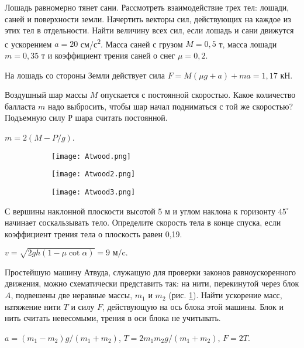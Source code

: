 \begin{ex} %
Лошадь равномерно тянет сани. Рассмотреть взаимодействие трех тел: лошади, саней и поверхности земли. Начертить векторы сил, действующих на каждое из этих тел в отдельности. Найти величину всех сил, если лошадь и сани движутся с ускорением $a = 20$ см/с\textsuperscript{2}. Масса саней с грузом $M = 0,5$ т, масса лошади $m = 0,35$ т и коэффициент трения саней о снег $\mu = 0,2$.
\begin{ans}
На лошадь со стороны Земли действует сила $F = M(\mu g + a) + ma = 1,17$ кН.
\end{ans}
\end{ex}

\begin{ex} %
Воздушный шар массы $M$ опускается с постоянной скоростью. Какое количество балласта $m$ надо выбросить, чтобы шар начал подниматься с той же скоростью? Подъемную силу $Р$ шара считать постоянной.
\begin{ans}
$m = 2(M - P/g)$.
\end{ans}
\end{ex}

\begin{figure}[h]
\centering
\begin{subfigure}[t]{.3\textwidth}
  \centering
  \texttt{[image: Atwood.png]}
  \caption{}
  \label{Atwood}
\end{subfigure}
\begin{subfigure}[t]{.3\textwidth}
  \centering
  \texttt{[image: Atwood2.png]}
  \caption{}
  \label{Atwood2}
\end{subfigure}
\begin{subfigure}[t]{.3\textwidth}
  \centering
  \texttt{[image: Atwood3.png]}
  \caption{}
  \label{Atwood3}
\end{subfigure}
\caption{}
\end{figure}

\begin{ex}
С вершины наклонной плоскости высотой 5 м и углом наклона к горизонту $45^{\circ}$ начинает соскальзывать тело. Определите скорость тела в конце спуска, если коэффициент трения тела  о плоскость равен 0,19.
\begin{ans}
$ v = \sqrt{2gh(1 - \mu \cot \alpha)} = 9 \textrm{ м/c}.$
\end{ans}
\end{ex}

\begin{ex} %
Простейшую машину Атвуда, служащую для проверки законов равноускоренного движения, можно схематически представить так: на нити, перекинутой через блок $A$, подвешены две неравные массы, $m_1$
и $m_2$ (рис. \ref{Atwood}). Найти ускорение масс, натяжение нити $T$ и силу $F$, действующую на ось блока этой машины. Блок и нить считать невесомыми, трения в оси блока не учитывать.
\begin{ans}
$a = (m_1 - m_2)g / (m_1 + m_2)$, $T = 2 m_1 m_2 g /(m_1 + m_2)$, $F = 2T$.
\end{ans}
\end{ex}

